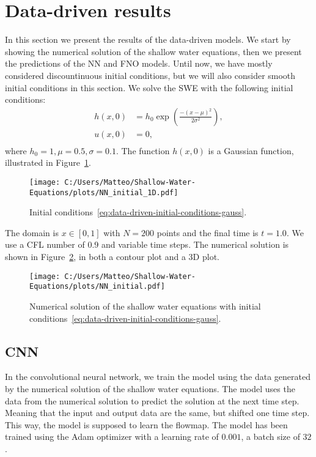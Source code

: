 \section{Data-driven results}
In this section we present the results of the data-driven models.
We start by showing the numerical solution of the shallow water equations, then we present the predictions of the NN and FNO models.
Until now, we have mostly considered discountinuous initial conditions, but we will also consider smooth initial conditions in this section.
We solve the SWE with the following initial conditions:
\begin{equation}\label{eq:data-driven-initial-conditions-gauss}
    \begin{aligned}
        h(x, 0) &= h_0 \exp \left( \frac{-{(x-\mu)}^2}{2 \sigma^2} \right) ,\\
        u(x, 0) &= 0 , \\
    \end{aligned}
\end{equation}
where $h_0 = 1, \mu = 0.5, \sigma = 0.1$. 
The function $h(x, 0)$ is a Gaussian function, illustrated in Figure~\ref{fig:NN_initial_1D}.
\begin{figure}[H]
    \centering
    \texttt{[image: C:/Users/Matteo/Shallow-Water-Equations/plots/NN\_initial\_1D.pdf]}
    \caption{Initial conditions~\eqref{eq:data-driven-initial-conditions-gauss}.} \label{fig:NN_initial_1D}
\end{figure}
The domain is $ x \in [0, 1]$ with $N = 200$ points and the final time is $t = 1.0$.
We use a CFL number of $0.9$ and variable time steps.
The numerical solution is shown in Figure~\ref{fig:NN_initial}, in both a contour plot and a 3D plot.
\begin{figure}[H]
    \centering
    \texttt{[image: C:/Users/Matteo/Shallow-Water-Equations/plots/NN\_initial.pdf]}
    \caption{Numerical solution of the shallow water equations with initial conditions~\eqref{eq:data-driven-initial-conditions-gauss}.}\label{fig:NN_initial}
\end{figure}


\subsection{CNN}
In the convolutional neural network, we train the model using the data generated by the numerical solution of the shallow water equations.
The model uses the data from the numerical solution to predict the solution at the next time step.
Meaning that the input and output data are the same, but shifted one time step.
This way, the model is supposed to learn the flowmap.
The model has been trained using the Adam optimizer with a learning rate of $0.001$, a batch size of $32$.

